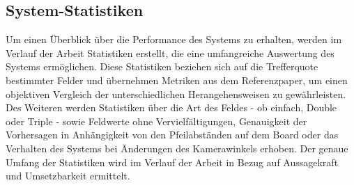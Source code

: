 \subsection{System-Statistiken}
\label{sec:methodik:statistiken}

Um einen Überblick über die Performance des Systems zu erhalten, werden im Verlauf der Arbeit Statistiken erstellt, die eine umfangreiche Auswertung des Systems ermöglichen. Diese Statistiken beziehen sich auf die Trefferquote bestimmter Felder und übernehmen Metriken aus dem Referenzpaper, um einen objektiven Vergleich der unterschiedlichen Herangehensweisen zu gewährleisten. Des Weiteren werden Statistiken über die Art des Feldes - ob einfach, Double oder Triple - sowie Feldwerte ohne Vervielfältigungen, Genauigkeit der Vorhersagen in Anhängigkeit von den Pfeilabständen auf dem Board oder das Verhalten des Systems bei Änderungen des Kamerawinkels erhoben. Der genaue Umfang der Statistiken wird im Verlauf der Arbeit in Bezug auf Aussagekraft und Umsetzbarkeit ermittelt.


